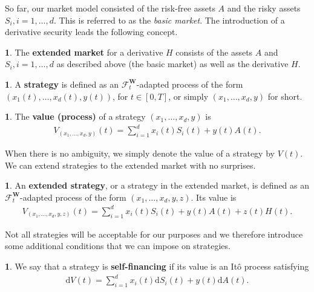 \documentclass[english]{article}
\numberwithin{equation}{section}
\numberwithin{figure}{section}
\theoremstyle{bolddescit}
\theoremstyle{definition}
\newtheorem{definition}[theorem]{\protect\definitionname}
\theoremstyle{definition}
\theoremstyle{plain}
\theoremstyle{plain}
\theoremstyle{bolddesc}
\theoremstyle{plain}
\theoremstyle{remark}
\providecommand{\definitionname}{Definition}
\begin{document}
So far, our market model consisted of the risk-free assets $A$ and the risky assets $S_i, i=1,\ldots,d$. This is referred to as the \textit{basic market}. The introduction of a derivative security leads the following concept.

\begin{definition}
  The \textbf{extended market} for a derivative $H$ consists of the assets $A$ and $S_i, i=1,\ldots,d$ as described above (the basic market) as well as the derivative $H$.
\end{definition}

\begin{definition}
  A \textbf{strategy} is defined as an $\mathcal{F}^\mathbf{W}_t$-adapted process of the form\\ $(x_1(t),\ldots,x_d(t),y(t))$, for $t \in [0,T]$, or simply $(x_1,\ldots,x_d,y)$ for short.
\end{definition}

\begin{definition}
  The \textbf{value (process)} of a strategy $(x_1,\ldots,x_d,y)$ is
  \begin{align*}
    V_{(x_1,\ldots,x_d,y)}(t) = \sum_{i=1}^d x_i(t) S_i(t) + y(t) A(t).
  \end{align*}
\end{definition}

When there is no ambiguity, we simply denote the value of a strategy by $V(t)$. We can extend strategies to the extended market with no surprises.

\begin{definition}
  An \textbf{extended strategy}, or a strategy in the extended market, is defined as an $\mathcal{F}^\mathbf{W}_t$-adapted process of the form $(x_1,\ldots,x_d,y,z)$. Its value is
  \begin{align*}
    V_{(x_1,\ldots,x_d,y,z)}(t)
    = \sum_{i=1}^d x_i(t) S_i(t) + y(t) A(t) + z(t) H(t).
  \end{align*}
\end{definition}

Not all strategies will be acceptable for our purposes and we therefore introduce some additional conditions that we can impose on strategies.

\begin{definition}
  We say that a strategy is \textbf{self-financing} if its value is an It\^o process satisfying
  \begin{align*}
    \mathrm{d}V(t) = \sum_{i=1}^d x_i(t) \mathrm{d}S_i(t) + y(t) \mathrm{d}A(t).
  \end{align*}
\end{definition}
\end{document}

